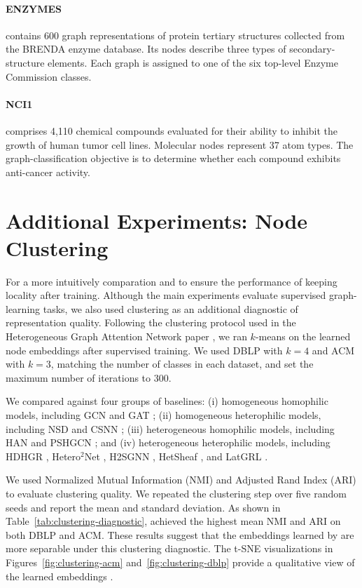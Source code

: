 \paragraph{ENZYMES}
contains 600 graph representations of protein tertiary structures
collected from the BRENDA enzyme database. Its nodes describe three types of
secondary-structure elements. Each graph is assigned to one of the six
top-level Enzyme Commission classes.
\paragraph{NCI1}
comprises 4,110 chemical compounds evaluated for their ability to inhibit
the growth of human tumor cell lines. Molecular nodes represent 37 atom types.
The graph-classification objective is to determine whether each compound
exhibits anti-cancer activity.




\section{Additional Experiments: Node Clustering}
\label{sec:additional-clustering}

For a more intuitively comparation and to ensure the performance of keeping locality after training. Although the main experiments evaluate supervised graph-learning tasks, we also used clustering as an additional diagnostic of representation quality. Following the clustering protocol used in the Heterogeneous Graph Attention Network paper \cite{wang2019han}, we ran $k$-means on the learned node embeddings after supervised training. We used DBLP with $k=4$ and ACM with $k=3$, matching the number of classes in each dataset, and set the maximum number of iterations to 300.

We compared \method{} against four groups of baselines: (i) homogeneous homophilic models, including GCN \cite{kipf2017gcn} and GAT \cite{velickovic2018gat}; (ii) homogeneous heterophilic models, including NSD \cite{bodnar2022neural} and CSNN \cite{ribeiro2026cooperative}; (iii) heterogeneous homophilic models, including HAN \cite{wang2019han} and PSHGCN \cite{he2024spectral}; and (iv) heterogeneous heterophilic models, including HDHGR \cite{guo2023homophily}, Hetero$^2$Net \cite{li2025hetero2net}, H2SGNN \cite{lu2026addressing}, HetSheaf \cite{braithwaite2024heterogeneous}, and LatGRL \cite{shen2025heterophily}.

We used Normalized Mutual Information (NMI) and Adjusted Rand Index (ARI) to evaluate clustering quality. We repeated the clustering step over five random seeds and report the mean and standard deviation. As shown in Table~\ref{tab:clustering-diagnostic}, \method{} achieved the highest mean NMI and ARI on both DBLP and ACM. These results suggest that the embeddings learned by \method{} are more separable under this clustering diagnostic. The t-SNE visualizations in Figures~\ref{fig:clustering-acm} and~\ref{fig:clustering-dblp} provide a qualitative view of the learned embeddings \cite{van2008tsne}.

